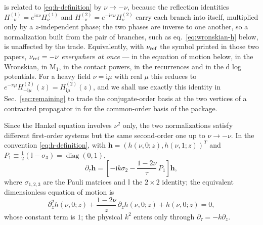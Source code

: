 \documentclass[11pt,a4paper]{article}
\newcommand{\ii}{\mathrm i}
\newcommand{\Id}{\mathbb I}
\newcommand{\diag}{\operatorname{diag}}
\begin{document}
\cite{Chen:2023iix,Chen:2024glu} is related to \eqref{eq:h-definition} by $\nu\to-\nu$, because the
reflection identities $H^{(1)}_{-\nu}=e^{\ii\pi\nu}H^{(1)}_\nu$ and
$H^{(2)}_{-\nu}=e^{-\ii\pi\nu}H^{(2)}_\nu$ carry each branch into itself, multiplied only by a
$z$-independent phase; the two phases are inverse to one another, so a normalization built from the
pair of branches, such as eq.~\eqref{eq:wronskian-h} below, is unaffected by the trade.
Equivalently, with $\nu_{\rm ref}$ the symbol
printed in those two papers, $\nu_{\rm ref}=-\nu$ \emph{everywhere at once} --- in the equation of
motion below, in the Wronskian, in $\text{M}_1$, in the contact powers, in the recurrences and in the
d log potentials. For a heavy field $\nu=\ii\mu$ with real $\mu$ this reduces to
$e^{-\pi\mu}H^{(2)}_{-\ii\mu}(z)=H^{(2)}_{\ii\mu}(z)$, and we shall use exactly this identity in
Sec.~\ref{sec:remaining} to trade the conjugate-order basis at the two vertices of a contracted propagator
in \cite{Chen:2024glu} for the common-order basis of the package.

Since the Hankel equation involves $\nu^2$ only, the two normalizations satisfy different
first-order systems but the same second-order one up to $\nu\to-\nu$. In the convention
\eqref{eq:h-definition}, with $\bm h=(h(\nu,0;z),h(\nu,1;z))^T$ and
$P_1\equiv\tfrac12(\Id-\sigma_3)=\diag(0,1)$,
\begin{equation}
  \partial_\tau\bm h
  =\left[-\ii k\sigma_2-\frac{1-2\nu}{\tau}\,P_1\right]\bm h,
  \label{eq:h-first-order-system}
\end{equation}
where $\sigma_{1,2,3}$ are the Pauli matrices and $\Id$ the $2\times2$ identity; the equivalent
dimensionless equation of motion is
\begin{equation}
  \partial_z^2h(\nu,0;z)+\frac{1-2\nu}{z}\,\partial_zh(\nu,0;z)+h(\nu,0;z)=0,
  \label{eq:h-dimensionless-eom}
\end{equation}
whose constant term is $1$; the physical $k^2$ enters only through $\partial_\tau=-k\partial_z$.
\end{document}
